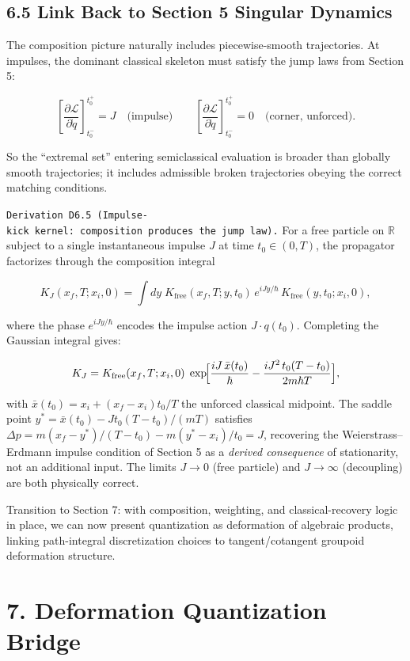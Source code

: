 \documentclass[
]{article}
\begin{document}
\subsection{6.5 Link Back to Section 5 Singular
Dynamics}\label{link-back-to-section-5-singular-dynamics}

The composition picture naturally includes piecewise-smooth
trajectories. At impulses, the dominant classical skeleton must satisfy
the jump laws from Section 5:

\[
\left[\frac{\partial\mathcal L}{\partial\dot q}\right]_{t_0^-}^{t_0^+}=J
\quad\text{(impulse)}
\qquad
\left[\frac{\partial\mathcal L}{\partial\dot q}\right]_{t_0^-}^{t_0^+}=0
\quad\text{(corner, unforced)}.
\]

So the ``extremal set'' entering semiclassical evaluation is broader
than globally smooth trajectories; it includes admissible broken
trajectories obeying the correct matching conditions.

\texttt{Derivation\ D6.5\ (Impulse-kick\ kernel:\ composition\ produces\ the\ jump\ law).}
For a free particle on \(\mathbb R\) subject to a single instantaneous
impulse \(J\) at time \(t_0\in(0,T)\), the propagator factorizes through
the composition integral

\[
K_J(x_f,T;x_i,0)=\int dy\;K_{\mathrm{free}}(x_f,T;y,t_0)\,e^{iJy/\hbar}\,K_{\mathrm{free}}(y,t_0;x_i,0),
\]

where the phase \(e^{iJy/\hbar}\) encodes the impulse action
\(J\cdot q(t_0)\). Completing the Gaussian integral gives:

\[
K_J=K_{\mathrm{free}}(x_f,T;x_i,0)\;\exp\!\Bigl[\frac{iJ\,\bar x(t_0)}{\hbar}-\frac{iJ^2\,t_0(T-t_0)}{2m\hbar T}\Bigr],
\]

with \(\bar x(t_0)=x_i+(x_f-x_i)t_0/T\) the unforced classical midpoint.
The saddle point \(y^\ast=\bar x(t_0)-Jt_0(T-t_0)/(mT)\) satisfies
\(\Delta p=m(x_f-y^\ast)/(T-t_0)-m(y^\ast-x_i)/t_0=J\), recovering the
Weierstrass--Erdmann impulse condition of Section 5 as a \emph{derived
consequence} of stationarity, not an additional input. The limits
\(J\to 0\) (free particle) and \(J\to\infty\) (decoupling) are both
physically correct.

Transition to Section 7: with composition, weighting, and
classical-recovery logic in place, we can now present quantization as
deformation of algebraic products, linking path-integral discretization
choices to tangent/cotangent groupoid deformation structure.

\section{7. Deformation Quantization
Bridge}\label{deformation-quantization-bridge}
\end{document}
